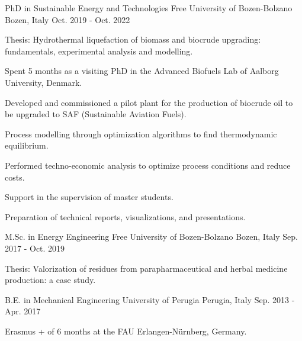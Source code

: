 

\begin{cventries}

  \cventry
  {PhD in Sustainable Energy and Technologies} %
  {Free University of Bozen-Bolzano} %
  {Bozen, Italy} %
  {Oct. 2019 - Oct. 2022} %
  {
    \begin{cvitems} %
      \item {Thesis: Hydrothermal liquefaction of biomass and biocrude upgrading: fundamentals, experimental analysis and modelling.}
      \item {Spent 5 months as a visiting PhD in the Advanced Biofuels Lab of Aalborg University, Denmark.}
      \item {Developed and commissioned a pilot plant for the production of biocrude oil to be upgraded to SAF (Sustainable Aviation Fuels).}
      \item {Process modelling through optimization algorithms to find thermodynamic equilibrium.}
      \item {Performed techno-economic analysis to optimize process conditions and reduce costs.}
      \item {Support in the supervision of master students.}
      \item {Preparation of technical reports, visualizations, and presentations.}
    \end{cvitems}
  }

  \cventry
  {M.Sc. in Energy Engineering} %
  {Free University of Bozen-Bolzano} %
  {Bozen, Italy} %
  {Sep. 2017 - Oct. 2019} %
  {
    \begin{cvitems} %
      \item {Thesis: Valorization of residues from parapharmaceutical and herbal medicine production: a case study.}
    \end{cvitems}
  }

  \cventry
  {B.E. in Mechanical Engineering} %
  {University of Perugia} %
  {Perugia, Italy} %
  {Sep. 2013 - Apr. 2017} %
  {
    \begin{cvitems} %
      \item {Erasmus + of 6 months at the FAU Erlangen-Nürnberg, Germany.}
    \end{cvitems}
  }

\end{cventries}
